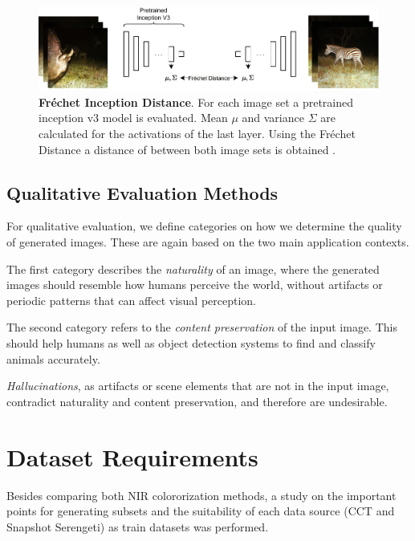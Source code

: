 \begin{figure}[htp!]
    \centering
    \includegraphics[width=.9\textwidth]{gfx/FID.pdf}
    \caption{
        \textbf{Fréchet Inception Distance}.
        For each image set a pretrained inception v3 model is evaluated.
        Mean $\mu$ and variance $\Sigma$ are calculated for the activations of the last layer.
        Using the Fréchet Distance a distance of between both image sets is obtained \parencite{ttur}.
    }
    \label{fig:fid}
\end{figure}

\label{sec:evaluate-fid}

\subsection{Qualitative Evaluation Methods}
For qualitative evaluation, we define categories on how we determine the quality of generated images. These are again based on the two main application contexts.

The first category describes the \textit{naturality} of an image, where the generated images should resemble how humans perceive the world, without artifacts or periodic patterns that can affect visual perception.

The second category refers to the \textit{content preservation} of the input image. This should help humans as well as object detection systems to find and classify animals accurately.

\textit{Hallucinations}, as artifacts or scene elements that are not in the input image, contradict naturality and content preservation, and therefore are undesirable.


\section{Dataset Requirements}
Besides comparing both NIR colororization methods, a study on the important points for generating subsets and the suitability of each data source
(CCT and Snapshot Serengeti) as train datasets was performed.

